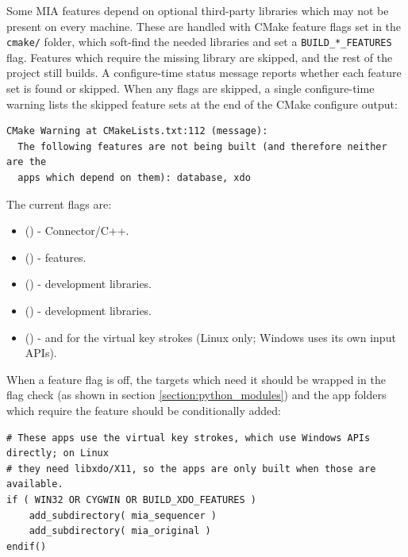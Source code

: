 Some MIA features depend on optional third-party libraries which may not be present on every machine. These are handled with CMake feature flags set in the \texttt{cmake/} folder, which soft-find the needed libraries and set a \texttt{BUILD\_*\_FEATURES} flag. Features which require the missing library are skipped, and the rest of the project still builds. A configure-time status message reports whether each feature set is found or skipped. When any flags are skipped, a single configure-time warning lists the skipped feature sets at the end of the CMake configure output:
\begin{lstlisting}[style=makestyle]
CMake Warning at CMakeLists.txt:112 (message):
  The following features are not being built (and therefore neither are the
  apps which depend on them): database, xdo
\end{lstlisting}
The current flags are:
\begin{itemize}\itemsep0em
	\item {} () -  Connector/C++.
	\item {} () -   features.
	\item {} () -  development libraries.
	\item {} () -  development libraries.
	\item {} () -  and  for the virtual key strokes (Linux only; Windows uses its own input APIs).
\end{itemize}

When a feature flag is off, the  targets which need it should be wrapped in the flag check (as shown in section \ref{section:python_modules}) and the app folders which require the feature should be conditionally added:
\begin{lstlisting}[style=makestyle]
# These apps use the virtual key strokes, which use Windows APIs directly; on Linux
# they need libxdo/X11, so the apps are only built when those are available.
if ( WIN32 OR CYGWIN OR BUILD_XDO_FEATURES )
    add_subdirectory( mia_sequencer )
    add_subdirectory( mia_original )
endif()
\end{lstlisting}










